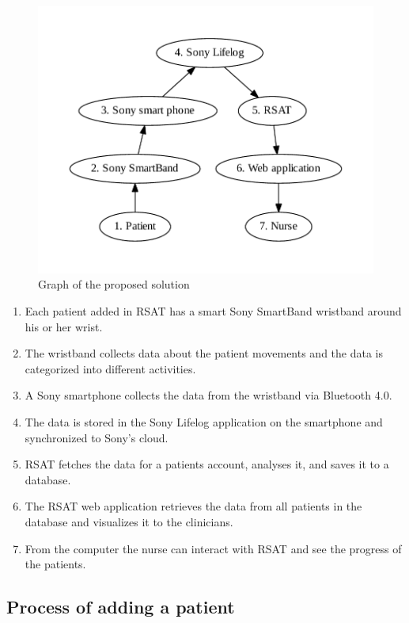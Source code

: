 \documentclass{cslthse-msc}
\begin{document}
\begin{figure}[!hbt]
\centering
\includegraphics[scale=0.8]{proposed.pdf} 
\caption{Graph of the proposed solution}\label{fig:pro}
\end{figure}


\begin{enumerate}
    \item Each patient added in RSAT has a smart Sony SmartBand wristband around his or her wrist.
    \item The wristband collects data about the patient movements and the data is categorized into different activities.
    \item A Sony smartphone collects the data from the wristband via Bluetooth 4.0. 
    \item The data is stored in the Sony Lifelog application on the smartphone and synchronized to Sony's cloud.
    \item RSAT fetches the data for a patients account, analyses it, and saves it to a database.
\item The RSAT web application retrieves the data from all patients in the database and visualizes it to the clinicians.
\item From the computer the nurse can interact with RSAT and see the progress of the patients. 
\end{enumerate}

\subsection{Process of adding a patient}
\end{document}
